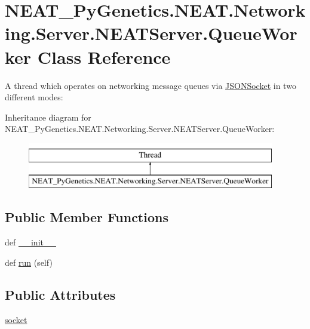 \hypertarget{classNEAT__PyGenetics_1_1NEAT_1_1Networking_1_1Server_1_1NEATServer_1_1QueueWorker}{}\section{N\+E\+A\+T\+\_\+\+Py\+Genetics.\+N\+E\+A\+T.\+Networking.\+Server.\+N\+E\+A\+T\+Server.\+Queue\+Worker Class Reference}
\label{classNEAT__PyGenetics_1_1NEAT_1_1Networking_1_1Server_1_1NEATServer_1_1QueueWorker}


A thread which operates on networking message queues via \hyperlink{namespaceNEAT__PyGenetics_1_1NEAT_1_1Networking_1_1Server_1_1JSONSocket}{J\+S\+O\+N\+Socket} in two different modes\+:  


Inheritance diagram for N\+E\+A\+T\+\_\+\+Py\+Genetics.\+N\+E\+A\+T.\+Networking.\+Server.\+N\+E\+A\+T\+Server.\+Queue\+Worker\+:\begin{figure}[H]
\begin{center}
\leavevmode
\includegraphics[height=2.000000cm]{classNEAT__PyGenetics_1_1NEAT_1_1Networking_1_1Server_1_1NEATServer_1_1QueueWorker}
\end{center}
\end{figure}
\subsection*{Public Member Functions}
\begin{DoxyCompactItemize}
\item 
def \hyperlink{classNEAT__PyGenetics_1_1NEAT_1_1Networking_1_1Server_1_1NEATServer_1_1QueueWorker_a413e2f230b433bfc4f137f1ae1a331e5}{\+\_\+\+\_\+init\+\_\+\+\_\+}
\item 
def \hyperlink{classNEAT__PyGenetics_1_1NEAT_1_1Networking_1_1Server_1_1NEATServer_1_1QueueWorker_a856d13880c0616f9b0c25b02788a54e3}{run} (self)
\end{DoxyCompactItemize}
\subsection*{Public Attributes}
\begin{DoxyCompactItemize}
\item 
\hyperlink{classNEAT__PyGenetics_1_1NEAT_1_1Networking_1_1Server_1_1NEATServer_1_1QueueWorker_ad5eb20f5b3bfb6a6aafa945bd5103c1b}{socket}
\end{DoxyCompactItemize}


